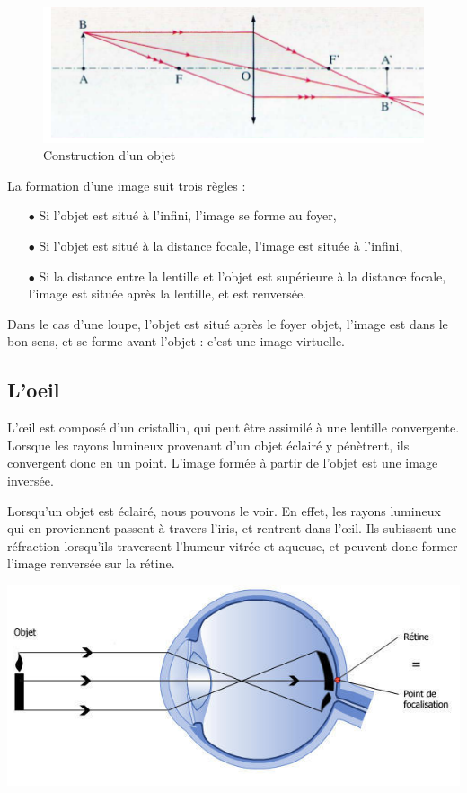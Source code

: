 \documentclass[a4paper, 12pt, onecolumn, openany]{report}
\begin{document}
	\begin{figure}[h]
	\begin{center}
	\includegraphics[scale=0.9]{formation_image.png}
	\end{center}
	\caption{Construction d'un objet}
	\label{Construction d'un objet}
	\end{figure}
		
		La formation d’une image suit trois règles :
		\begin{itemize}
		\item[$\bullet$] Si l’objet est situé à l’infini, l’image se forme au foyer,
		\item[$\bullet$] Si l’objet est situé à la distance focale, l’image est située à l’infini,
		\item[$\bullet$] Si la distance entre la lentille et l’objet est supérieure à la distance focale, l’image est située après la lentille, et est renversée.
		\end{itemize}
		
	Dans le cas d’une loupe, l’objet est situé après le foyer objet, l’image est dans le bon sens, et se forme avant l’objet : c’est une image virtuelle.

\newpage
		\subsection{L'oeil}
		L’œil est composé d’un cristallin, qui peut être assimilé à une lentille convergente. Lorsque les rayons lumineux provenant d’un objet éclairé y pénètrent, ils convergent donc en un point. L’image formée à partir de l’objet est une image inversée.
		
		Lorsqu’un objet est éclairé, nous pouvons le voir. En effet, les rayons lumineux qui en proviennent passent à travers l’iris, et rentrent dans l’œil. Ils subissent une réfraction lorsqu’ils traversent l’humeur vitrée et aqueuse, et peuvent donc former l’image renversée sur la rétine.
		
	\includegraphics[scale=0.2]{rayons_lumineux.jpg}
		
\end{document}
